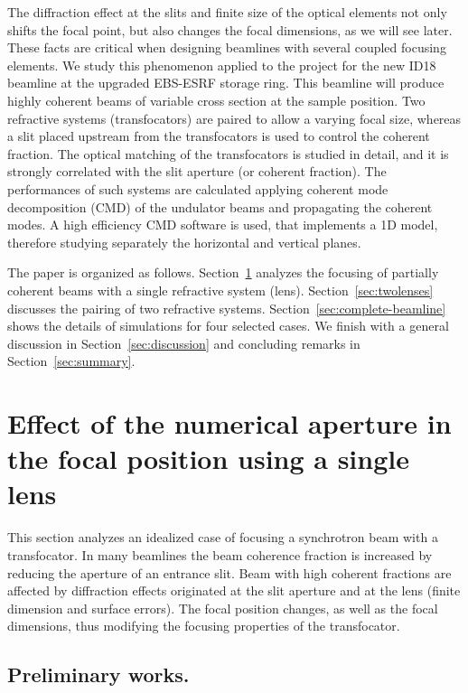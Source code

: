 \documentclass{iucr}              %
\begin{document}
The diffraction effect at the slits and finite size of the optical elements not only shifts the focal point, but also changes the focal dimensions, as we will see later. These facts are critical when designing beamlines with several coupled focusing elements. We study this phenomenon applied to the project for the new ID18 beamline at the upgraded EBS-ESRF storage ring. This beamline will produce highly coherent beams of variable cross section at the sample position. Two refractive systems (transfocators) are paired to allow a varying focal size, whereas a slit placed upstream from the transfocators is used to control the coherent fraction. The optical matching of the transfocators is studied in detail, and it is strongly correlated with the slit aperture (or coherent fraction). The performances of such systems are calculated applying coherent mode decomposition (CMD) of the undulator beams and propagating the coherent modes. A high efficiency CMD software is used, that implements a 1D model, therefore studying separately the horizontal and vertical planes. 

The paper is organized as follows. Section~\ref{sec:onelens} analyzes the focusing of partially coherent beams with a single refractive system (lens). Section~\ref{sec:twolenses} discusses the pairing of two refractive systems. Section~\ref{sec:complete-beamline} shows the details of simulations for four selected cases. We finish with a general discussion in Section~\ref{sec:discussion} and  concluding remarks in Section~\ref{sec:summary}. 


\section{Effect of the numerical aperture in the focal position using a single lens}\label{sec:onelens}

This section analyzes an idealized case of focusing a synchrotron beam with a transfocator. In many beamlines the beam coherence fraction is increased by reducing the aperture of an entrance slit. Beam with high coherent fractions are affected by diffraction effects originated at the slit aperture and at the lens (finite dimension and surface errors). The focal position changes, as well as the focal dimensions, thus modifying the focusing properties of the transfocator. 

\subsection{Preliminary works.}
\end{document}
